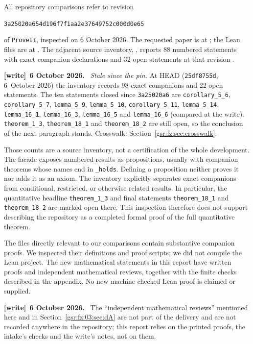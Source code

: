 \documentclass[11pt,letterpaper]{article}
\numberwithin{equation}{section}
\theoremstyle{definition}
\theoremstyle{remark}
\newcommand{\1}{\mathbf 1}
\newcommand{\revision}{\texttt{3a25020a654d196f7f1aa2e37649752c000d0e65}}
\newcommand{\repo}{\texttt{ProveIt}}
\newcommand{\file}[1]{\nolinkurl{#1}}
\newenvironment{writenote}[1][]{\par\smallskip\begingroup\small
 \noindent\textbf{[write]}\if\relax\detokenize{#1}\relax\else~\textbf{#1.}\fi\ }%
 {\par\endgroup\smallskip}
\begin{document}
All repository comparisons refer to revision
\begin{center}\small\revision\end{center}
of \repo, inspected on 6 October 2026. The requested paper is at
; the Lean files
are at .
The adjacent source inventory, , reports
88 numbered statements with exact companion declarations and 32 open
statements at that revision \cite{repo03status}.
\begin{writenote}[6 October 2026]
\emph{Stale since the pin.} At HEAD (\texttt{25df8755d}, 6~October 2026) the inventory records 98 exact companions and 22 open statements. The ten statements closed since \texttt{3a25020a6} are \file{corollary_5_6}, \file{corollary_5_7}, \file{lemma_5_9}, \file{lemma_5_10}, \file{corollary_5_11}, \file{lemma_5_14}, \file{lemma_16_1}, \file{lemma_16_3}, \file{lemma_16_5} and \file{lemma_16_6} (compared at the write). \file{theorem_1_3}, \file{theorem_18_1} and \file{theorem_18_2} are still open, so the conclusion of the next paragraph stands. Crosswalk: Section~\ref{gsr:fz:sec:crosswalk}.
\end{writenote}

Those counts are a source inventory, not a certification of the whole
development. The facade exposes numbered results as propositions, usually
with companion theorems whose names end in \texttt{\_holds}. Defining a
proposition neither proves it nor adds it as an axiom. The inventory
explicitly separates exact companions from conditional, restricted, or
otherwise related results. In particular, the quantitative headline
\texttt{theorem\_1\_3} and final statements
\texttt{theorem\_18\_1} and \texttt{theorem\_18\_2} are marked open
there. This inspection therefore does not support describing the
repository as a completed formal proof of the full quantitative theorem.

The files directly relevant to our comparisons contain substantive
companion proofs. We inspected their definitions and proof scripts; we did
not compile the Lean project. The new mathematical statements in this
report have written proofs and independent mathematical reviews, together
with the finite checks described in the appendix. No new machine-checked
Lean proof is claimed or supplied.
\begin{writenote}[6 October 2026]
The ``independent mathematical reviews'' mentioned here and in Section~\ref{gsr:fz:03:sec:dA} are not part of the delivery and are not recorded anywhere in the repository; this report relies on the printed proofs, the intake's checks and the write's notes, not on them.
\end{writenote}
\end{document}
